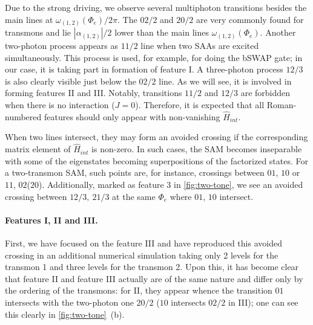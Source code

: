 \documentclass[%
 prx,
 amsmath,amssymb,
 reprint,%
]{revtex4-1}
\begin{document}
Due to the strong driving, we observe several multiphoton transitions besides the main lines at $\omega_{(1,2)}(\Phi_e)/2\pi$. The ${02/2}$ and ${20/2}$ are very commonly found for transmons and lie $|\alpha_{(1,2)}|/2$ lower than the main lines $\omega_{(1,2)}(\Phi_e)$. Another two-photon process appears as $11/2$ line when two SAAs are excited simultaneously. This process is used, for example, for doing the bSWAP gate\cite{poletto2012entanglement}; in our case, it is taking part in formation of feature I. A three-photon process $12/3$ is also clearly visible just below the $02/2$ line. As we will see, it is involved in forming features II and III. Notably, transitions $11/2$ and ${12/3}$ are forbidden when there is no interaction ($J=0$). Therefore, it is expected that all Roman-numbered features should only appear with non-vanishing $\hat H_{int}$.

When two lines intersect, they may form an avoided crossing if the corresponding matrix element of $\hat H_{int}$ is non-zero. In such cases, the SAM becomes inseparable with some of the eigenstates becoming superpositions of the factorized states. For a two-transmon SAM, such points are, for instance, crossings between ${01}$, ${10}$ or $ {11} $, $ {02} $($ {20} $). Additionally, marked as feature 3 in \autoref{fig:two-tone}, we see an avoided crossing between ${12}/3,\ {21}/3$ at the same $\Phi_e$ where ${01}$, ${10}$ intersect.


\paragraph{Features I, II and III.} First, we have focused on the feature III and have reproduced this avoided crossing in an additional numerical simulation taking only 2 levels for the transmon 1 and three levels for the transmon 2. Upon this, it has become clear that feature II and feature III actually are of the same nature and differ only by the ordering of the transmons: for II, they appear whence the transition ${01}$ intersects with the two-photon one ${20/2}$ (${10}$ intersects ${02/2}$ in III); one can see this clearly in \autoref{fig:two-tone}~(b).
\end{document}
